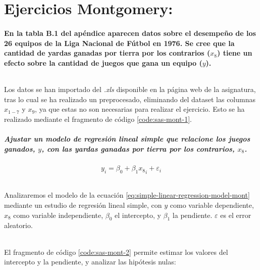 \documentclass{article}
\begin{document}
  \part{Ejercicios Montgomery:}

  \setcounter{section}{2}
  \subsection{En la tabla B.1 del apéndice aparecen datos sobre el desempeño de los 26 equipos de la Liga Nacional de Fútbol en 1976. Se cree que la cantidad de yardas ganadas por tierra por los contrarios ($x_8$) tiene un efecto sobre la cantidad de juegos que gana un equipo ($y$).}
  \paragraph{}
  Los datos se han importado del \emph{.xls} disponible en la página web de la asignatura, tras lo cual se ha realizado un preprocesado, eliminando del dataset las columnas $x_{1-7}$ y $x_9$, ya que estas no son necesarias para realizar el ejercicio. Esto se ha realizado mediante el fragmento de código \ref{code:sas-mont-1}.

  \subsubsection{Ajustar un modelo de regresión lineal simple que relacione los juegos ganados, $y$, con las yardas ganadas por tierra por los contrarios, $x_8$.}

  \begin{equation}
  \label{eq:simple-linear-regression-model-mont}
    y_i = \beta_0 + \beta_1{x_8}_i + \varepsilon_i
  \end{equation}
  \paragraph{}
  Analizaremos el modelo de la ecuación \ref{eq:simple-linear-regression-model-mont} mediante un estudio de regresión lineal simple, con $y$ como variable dependiente, $x_8$ como variable independiente, $\beta_0$ el intercepto, y $\beta_1$ la pendiente. $\varepsilon$ es el error aleatorio.

  \paragraph{}
  El fragmento de código \ref{code:sas-mont-2} permite estimar los valores del intercepto y la pendiente, y analizar las hipótesis nulas:
\end{document}
